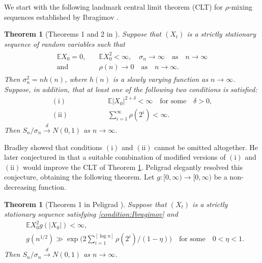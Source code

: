 \documentclass[11pt,a4,leqno]{amsart}
\newtheorem{theorem}[lemma]{Theorem}
\newcommand{\E }{{\mathbb E}}
\newcommand{\1}{{\mathbf 1}}
\begin{document}
We start with the following landmark central limit theorem (CLT) for $\rho$-mixing sequences established by Ibragimov \cite{ibragimov:1975}.

\begin{theorem}[Theorems 1 and 2 in \cite{ibragimov:1975}]
\label{thm:Ibragimov}
 Suppose that $(X_t)$ is a strictly stationary sequence of random variables such that 
\begin{align}
\begin{split}\label{condition:Ibragimov}
\E X_0 =0,&\quad \E X_0^2 <\infty,\quad \sigma_n\to\infty\quad \text{as}\quad n\to\infty \\ 
\text{and}&\quad \rho(n)\to 0\quad \text{as}\quad n\to\infty.
\end{split}
\end{align}
Then $\sigma_n^2=nh(n)$, where $h(n)$ is a slowly varying function as $n\to\infty$. Suppose, in addition, that at least one of the following two conditions is satisfied:
\begin{align*}
(\mathrm{i})  & \hspace{2cm} \E |X_0|^{2+\delta} <\infty\quad \text{for some}\quad \delta>0,\\ 
(\mathrm{ii}) & \hspace{2cm} \sum_{i=1}^\infty \rho (2^i)<\infty.  
\end{align*}
Then $S_n/\sigma_n\stackrel{d}{\to} N(0,1)$ as $n\to\infty$. 
\end{theorem}
Bradley \cite{bradley:1980} showed that conditions $(\mathrm{i})$ and $(\mathrm{ii})$ cannot be omitted altogether. 
He later conjectured in \cite{bradley:1987} that a suitable combination of modified versions of $(\mathrm{i})$ and 
$(\mathrm{ii})$ would improve the CLT of Theorem \ref{thm:Ibragimov}. Peligrad \cite{peligrad:1987} elegantly resolved 
this conjecture, obtaining the following theorem. Let $g:[0,\infty) \to [0,\infty)$ be a non-decreasing function. 

\begin{theorem}[Theorem 1 in Peligrad \cite{peligrad:1987}]
\label{peligrad:1987:clt:thm}
 Suppose that $(X_t)$ is a strictly stationary sequence satisfying \eqref{condition:Ibragimov} and 
\begin{align}
& \E X_0^2 g(|X_0|) <\infty, \label{condi:i:modified:1}\\
& g(n^{1/2}) \gg \exp\Big( 2\sum_{i=1}^{[\log n]}\rho (2^i)/(1-\eta) \Big)\quad \text{for some}\quad 0<\eta<1. \label{condi:ii:modified:1}
\end{align}
Then $S_n/\sigma_n\stackrel{d}{\to} N(0,1)$ as $n\to\infty$. 
\end{theorem}
\end{document}

